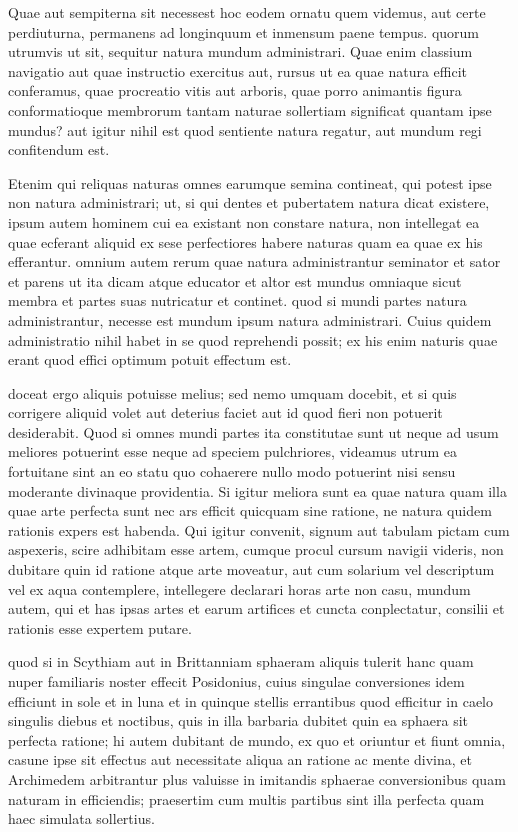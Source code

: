  Quae aut sempiterna sit necessest hoc eodem ornatu quem videmus, aut certe perdiuturna, permanens ad longinquum et inmensum paene tempus. quorum utrumvis ut sit, sequitur natura mundum administrari. Quae enim classium navigatio aut quae instructio exercitus aut, rursus ut ea quae natura efficit conferamus, quae procreatio vitis aut arboris, quae porro animantis figura conformatioque membrorum tantam naturae sollertiam significat quantam ipse mundus? aut igitur nihil est quod sentiente natura regatur, aut mundum regi confitendum est.

 Etenim qui reliquas naturas omnes earumque semina contineat, qui potest ipse non natura administrari; ut, si qui dentes et pubertatem natura dicat existere, ipsum autem hominem cui ea existant non constare natura, non intellegat ea quae ecferant aliquid ex sese perfectiores habere naturas quam ea quae ex his efferantur. omnium autem rerum quae natura administrantur seminator et sator et parens ut ita dicam atque educator et altor est mundus omniaque sicut membra et partes suas nutricatur et continet. quod si mundi partes natura administrantur, necesse est mundum ipsum natura administrari. Cuius quidem administratio nihil habet in se quod reprehendi possit; ex his enim naturis quae erant quod effici optimum potuit effectum est.

 doceat ergo aliquis potuisse melius; sed nemo umquam docebit, et si quis corrigere aliquid volet aut deterius faciet aut id quod fieri non potuerit desiderabit. Quod si omnes mundi partes ita constitutae sunt ut neque ad usum meliores potuerint esse neque ad speciem pulchriores, videamus utrum ea fortuitane sint an eo statu quo cohaerere nullo modo potuerint nisi sensu moderante divinaque providentia. Si igitur meliora sunt ea quae natura quam illa quae arte perfecta sunt nec ars efficit quicquam sine ratione, ne natura quidem rationis expers est habenda. Qui igitur convenit, signum aut tabulam pictam cum aspexeris, scire adhibitam esse artem, cumque procul cursum navigii videris, non dubitare quin id ratione atque arte moveatur, aut cum solarium vel descriptum vel ex aqua contemplere, intellegere declarari horas arte non casu, mundum autem, qui et has ipsas artes et earum artifices et cuncta conplectatur, consilii et rationis esse expertem putare.

 quod si in Scythiam aut in Brittanniam sphaeram aliquis tulerit hanc quam nuper familiaris noster effecit Posidonius, cuius singulae conversiones idem efficiunt in sole et in luna et in quinque stellis errantibus quod efficitur in caelo singulis diebus et noctibus, quis in illa barbaria dubitet quin ea sphaera sit perfecta ratione; hi autem dubitant de mundo, ex quo et oriuntur et fiunt omnia, casune ipse sit effectus aut necessitate aliqua an ratione ac mente divina, et Archimedem arbitrantur plus valuisse in imitandis sphaerae conversionibus quam naturam in efficiendis; praesertim cum multis partibus sint illa perfecta quam haec simulata sollertius.

